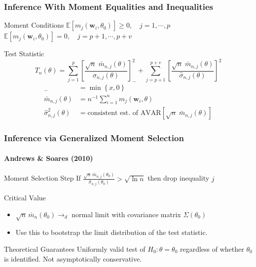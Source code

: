 \documentclass{beamer}
\begin{document}
\begin{frame}
  \frametitle{Inference With Moment Equalities and Inequalities}
  \small

\begin{block}{Moment Conditions}
  $\mathbb{E} \left[ m_j(\mathbf{w}_i,\theta_0) \right] \geq 0, \quad j = 1, \cdots, p$\\
  $\mathbb{E} \left[ m_j(\mathbf{w}_i,\theta_0) \right]  = 0, \quad j = p+1, \cdots, p + v$
\end{block}


\begin{block}{Test Statistic}
  \vspace{-1em}
\[
  T_n(\theta) = \sum_{j=1}^p \left[\frac{\sqrt{n}\; \bar{m}_{n,j}(\theta)}{\widehat{\sigma}_{n,j}(\theta)}\right]^2_- + \sum_{j=p+1}^{p+v} \left[\frac{\sqrt{n}\; \bar{m}_{n,j}(\theta)}{\widehat{\sigma}_{n,j}(\theta)}\right]^2
\]
\footnotesize
\begin{align*}
[x]_- &= \min\left\{ x, 0 \right\}\\
\bar{m}_{n,j}(\theta) &= n^{-1} \sum_{i=1}^{n} m_j(\mathbf{w}_i, \theta)\\
\widehat{\sigma}^2_{n,j}(\theta) &=  \mbox{consistent est.\ of } \mbox{AVAR}\left[  \sqrt{n}\; \bar{m}_{n,j}(\theta)\right]
\end{align*}
\end{block}

\end{frame}
\begin{frame}
  \frametitle{Inference via Generalized Moment Selection}
  \framesubtitle{Andrews \& Soares (2010)}

  \begin{block}{Moment Selection Step}
    If $\displaystyle\frac{\sqrt{n}\,\bar{m}_{n,j}(\theta_0)}{\widehat{\sigma}_{n,j}(\theta_0)} > \sqrt{\ln n}$ then drop inequality $j$
  \end{block}

  \begin{block}{Critical Value} 
    \begin{itemize}
      \item $\sqrt{n}\, \bar{m}_n(\theta_0) \rightarrow_d$ normal limit with covariance matrix $\Sigma(\theta_0)$
      \item Use this to bootstrap the limit distribution of the test statistic.
    \end{itemize}
  \end{block}

  \begin{block}{Theoretical Guarantees}
    Uniformly valid test of $H_0\colon \theta = \theta_0$ \alert{regardless of whether $\theta_0$ is identified}.
    Not asymptotically conservative.
  \end{block}

\end{frame}
\end{document}
